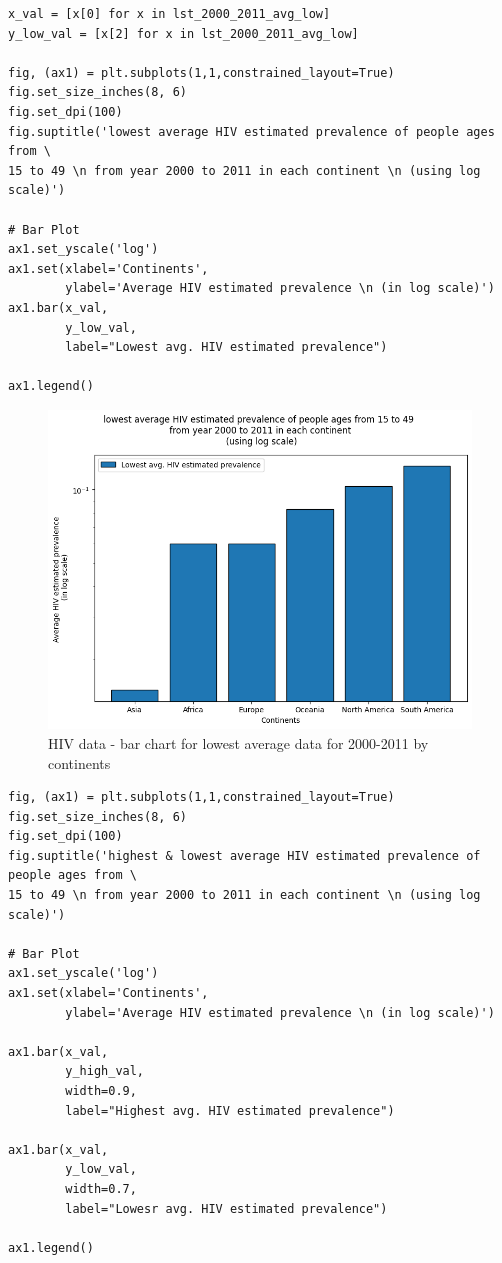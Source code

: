 \documentclass[UTF8, letter]{article}
\begin{document}
\pagebreak
\begin{codeblock}
\begin{verbatim}
x_val = [x[0] for x in lst_2000_2011_avg_low]
y_low_val = [x[2] for x in lst_2000_2011_avg_low]

fig, (ax1) = plt.subplots(1,1,constrained_layout=True)
fig.set_size_inches(8, 6)
fig.set_dpi(100)
fig.suptitle('lowest average HIV estimated prevalence of people ages from \
15 to 49 \n from year 2000 to 2011 in each continent \n (using log scale)')

# Bar Plot 
ax1.set_yscale('log')
ax1.set(xlabel='Continents', 
        ylabel='Average HIV estimated prevalence \n (in log scale)')
ax1.bar(x_val, 
        y_low_val,
        label="Lowest avg. HIV estimated prevalence")

ax1.legend()
\end{verbatim}
\end{codeblock}

\begin{figure}[h!]
	\centering
	\includegraphics[width=0.9\linewidth]{output_9.png}
	\caption{HIV data - bar chart for lowest average data for 2000-2011 by continents}
	\label{fig:boat1}
\end{figure}

\pagebreak
\begin{codeblock}
\begin{verbatim}
fig, (ax1) = plt.subplots(1,1,constrained_layout=True)
fig.set_size_inches(8, 6)
fig.set_dpi(100)
fig.suptitle('highest & lowest average HIV estimated prevalence of people ages from \
15 to 49 \n from year 2000 to 2011 in each continent \n (using log scale)')

# Bar Plot 
ax1.set_yscale('log')
ax1.set(xlabel='Continents', 
        ylabel='Average HIV estimated prevalence \n (in log scale)')

ax1.bar(x_val, 
        y_high_val, 
        width=0.9, 
        label="Highest avg. HIV estimated prevalence")

ax1.bar(x_val, 
        y_low_val, 
        width=0.7, 
        label="Lowesr avg. HIV estimated prevalence")

ax1.legend()
\end{verbatim}
\end{codeblock}
\end{document}
